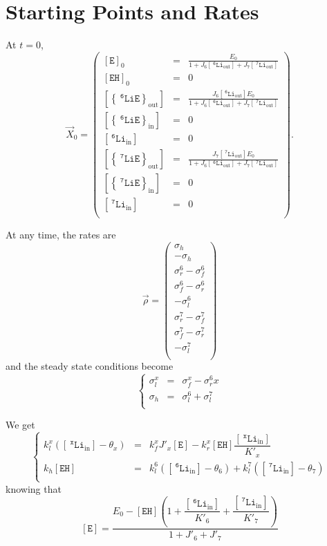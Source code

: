 \documentclass[aps,onecolumn,11pt]{revtex4}
\newcommand{\mychem}[1]{\mathtt{#1}}
\newcommand{\myconc}[1]{\left\lbrack{#1}\right\rbrack}
\newcommand{\spLi}[1]{{~^{\mychem{#1}}\mychem{Li}}}
\newcommand{\spEout}{\mychem{E}}
\newcommand{\Eout}{\myconc{\spEout}}
\newcommand{\spLiEin}[1]{\left\lbrace\spLi{#1}\spEout\right\rbrace_{\mathrm{in}}}
\newcommand{\LiEin}[1]{\myconc{\spLiEin{#1}}}
\newcommand{\spLiEout}[1]{\left\lbrace\spLi{#1}\spEout\right\rbrace_{\mathrm{out}}}
\newcommand{\LiEout}[1]{\myconc{\spLiEout{#1}}}
\newcommand{\spLiIn}[1]{{\spLi{#1}}_{\mathrm{in}}}
\newcommand{\LiIn}[1]{\myconc{\spLiIn{#1}}}
\newcommand{\spLiOut}[1]{{\spLi{#1}}_{\mathrm{out}}}
\newcommand{\LiOut}[1]{\myconc{\spLiOut{#1}}}
\newcommand{\spEHin}{\mychem{EH}}
\newcommand{\EHin}{\myconc{\spEHin}}
\begin{document}
\section{Starting Points and Rates}

At $t=0$,
\begin{equation}
	\vec{X}_0 = 
	\begin{pmatrix}
	\Eout_0    & = & \frac{E_0}{1+J_6 \LiOut{6} + J_7 \LiOut{7}}  \\
	\EHin_0    & = & 0 \\
	\LiEout{6} & = & \frac{J_6 \LiOut{6} E_0} {1+J_6 \LiOut{6} + J_7 \LiOut{7}} \\
	\LiEin{6}  & = & 0 \\
	\LiIn{6}   & = & 0 \\
	\LiEout{7} & = & \frac{J_7 \LiOut{7} E_0} {1+J_6 \LiOut{6} + J_7 \LiOut{7}}   \\
	\LiEin{7}  & = & 0 \\
	\LiIn{7}   & = & 0 \\
	\end{pmatrix}.
\end{equation}

At any time, the rates are
\begin{equation}
\vec{\rho} = 
\begin{pmatrix}
	\sigma_h\\
	-\sigma_h\\
	\sigma_r^6-\sigma_f^6\\
	\sigma_f^6-\sigma_r^6\\
	-\sigma_l^6\\
	\sigma_r^7-\sigma_f^7\\
	\sigma_f^7-\sigma_r^7\\
	-\sigma_l^7\\
\end{pmatrix}
\end{equation}
and the steady state conditions become
\begin{equation}
	\left\lbrace
	\begin{array}{rcl}
		\sigma_l^x & = & \sigma_f^x - \sigma_r^6x\\
		\sigma_h   & = & \sigma_l^6 + \sigma_l^7\\
	\end{array}
	\right.
\end{equation}

We get
\begin{equation}
\left\lbrace
	\begin{array}{rcl}
	k_l^x \left(\LiIn{x}-\theta_x\right) & = & k_f^x J'_x \Eout - k_r^x \EHin \dfrac{\LiIn{x}}{K'_x}\\
	k_h \EHin & = & k_l^6 \left(\LiIn{6}-\theta_6\right) + k_l^7 \left(\LiIn{7}-\theta_7\right)\\
	\end{array}
\right.
\end{equation}
knowing that
\begin{equation}
	\Eout = \dfrac{E_0 - \EHin \left( 1 + \dfrac{\LiIn{6}}{K'_6} + \dfrac{\LiIn{7}}{K'_7}\right)}
	{1+J'_6+J'_7}
\end{equation}
\end{document}
